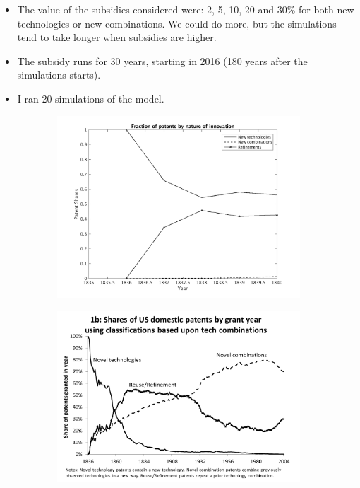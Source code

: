 \documentclass[serif]{article}
\theoremstyle{definition}
\begin{document}
\begin{itemize}
\item The value of the subsidies considered were: 2, 5, 10, 20 and 30\% for both new technologies or new combinations. We could do more, but the simulations tend to take longer when subsidies are higher.
\item The subsidy runs for 30 years, starting in 2016 (180 years after the simulations starts).
\item I ran 20 simulations of the model. 
\end{itemize}

\begin{figure}[h!]
\begin{subfigure}[b]{0.45\textwidth}
\includegraphics[width=\textwidth]{figures/patents.png}
\end{subfigure}
\begin{subfigure}[b]{0.45\textwidth}
\includegraphics[width=\textwidth]{figures/patents_data.png}
\end{subfigure}
\end{figure}
\end{document}
